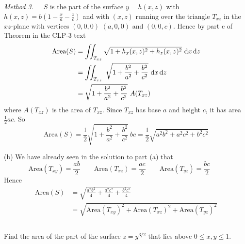 \begin{solution}
\emph{Method 3.}\ \ \ 
 $S$ is the part of the surface $y=h(x,z)$ with 
$h(x,z) = b\left(1-\frac{x}{a}-\frac{z}{c}\right)$
and with $(x,z)$ running over the triangle $T_{xz}$ in the $xz$-plane 
with vertices $(0,0,0)$ $(a,0,0)$ and $(0,0,c)$.
Hence by part c of Theorem  in the CLP-3 text
\begin{align*}
\text{Area}(S)&=\dblInt_{T_{xz}} \sqrt{1+h_x(x,z)^2+h_z(x,z)^2}\ \dee{x}\,\dee{z} \\
&=\dblInt_{T_{xz}}\ \sqrt{1+\frac{b^2}{a^2}+\frac{b^2}{c^2}}\  
\dee{x}\,\dee{z}\\
&=\sqrt{1+\frac{b^2}{a^2}+\frac{b^2}{c^2}}\ A(T_{xz})
\end{align*}
where $A(T_{xz})$ is the area of $T_{xz}$. Since $T_{xz}$ has base $a$ and 
height $c$, it has area $\frac{1}{2}ac$. So
\begin{equation*}
\text{Area}(S)=\frac{1}{2}\sqrt{1+\frac{b^2}{a^2}+\frac{b^2}{c^2}}\ bc 
 =\frac{1}{2}\sqrt{a^2b^2+a^2c^2+b^2c^2}
\end{equation*}

(b) We have already seen in the solution to part (a) that
\begin{equation*}
\text{Area}(T_{xy})=\frac{ab}{2}\qquad
\text{Area}(T_{xz})=\frac{ac}{2}\qquad
\text{Area}(T_{yz})=\frac{bc}{2}\qquad
\end{equation*}
Hence
\begin{align*}
\text{Area}(S) 
&=\sqrt{\frac{a^2b^2}{4}+\frac{a^2c^2}{4}+\frac{b^2c^2}{4}} \\
&=\sqrt{\text{Area}(T_{xy})^2
                     +\text{Area}(T_{xz})^2
                     +\text{Area}(T_{yz})^2
                     }
\end{align*}

\end{solution}


\subsection*{\Procedural}

\begin{question}[M317 2002A] %
 Find the area of the part of the surface $z=y^{3/2}$ that
lies above $0\le x,y\le 1$.
\end{question}


